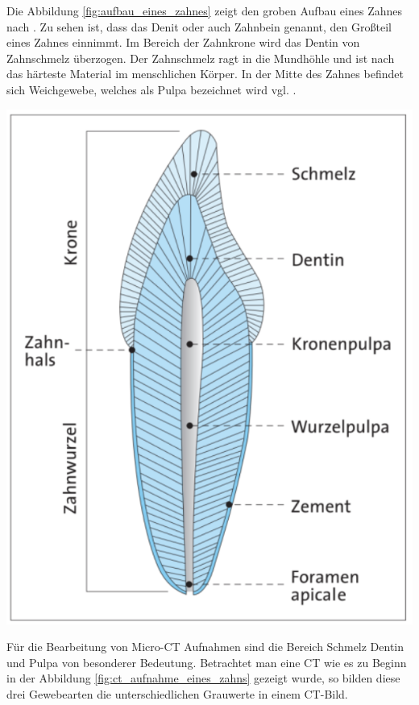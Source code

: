 \begin{minipage}{0.40\textwidth}
	Die Abbildung \ref{fig:aufbau_eines_zahnes} zeigt den groben Aufbau eines Zahnes
	nach \citet[Seite 17]{lehmann2012Zahnheilkunde}. Zu sehen ist, dass das Denit oder
	auch Zahnbein genannt, den Großteil eines Zahnes einnimmt. Im Bereich der Zahnkrone
	wird das Dentin von Zahnschmelz überzogen. Der Zahnschmelz ragt in die
	Mundhöhle und ist nach \citet[Seite 41]{lehmann2012Zahnheilkunde} das härteste
	Material im menschlichen Körper. In der Mitte des Zahnes befindet sich Weichgewebe,
	welches als Pulpa bezeichnet wird vgl. \citep[Seite ]{lehmann2012Zahnheilkunde}.
\end{minipage}
\hfill
\begin{minipage}{0.50\textwidth}
	\centering
	\includegraphics[scale=0.50]{img/aufbau_eines_zahns.jpg}
	 \label{fig:aufbau_eines_zahnes}
\end{minipage}

Für die Bearbeitung von Micro-CT Aufnahmen sind die Bereich Schmelz Dentin und Pulpa
von besonderer Bedeutung. Betrachtet man eine CT wie es zu Beginn in der
Abbildung \ref{fig:ct_aufnahme_eines_zahns} gezeigt wurde, so bilden diese drei Gewebearten
die unterschiedlichen Grauwerte in einem CT-Bild.

